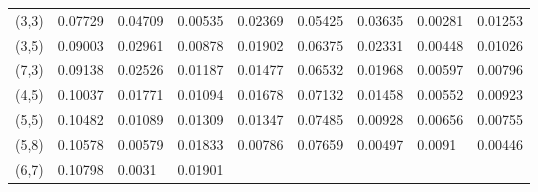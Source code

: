 \documentclass[10pt,twosided]{article}
\numberwithin{equation}{section}
\numberwithin{equation}{section}
\begin{document}
\begin{table}
\begin{tabular}{|p{41pt}|p{32pt}|p{38pt}|p{32pt}|p{38pt}|p{32pt}|p{38pt}|p{32pt}|p{38pt}|}
{} \\
\hline
\parbox{41pt}{\raggedright
(3,3)
} & \parbox{32pt}{\raggedright
0.07729
} & \parbox{38pt}{\raggedright
0.04709
} & \parbox{32pt}{\raggedright
0.00535
} & \parbox{38pt}{\raggedright
0.02369
} & \parbox{32pt}{\raggedright
0.05425
} & \parbox{38pt}{\raggedright
0.03635
} & \parbox{32pt}{\raggedright
0.00281
} & \parbox{38pt}{\raggedright
0.01253
} \\
\hline
\parbox{41pt}{\raggedright
(3,5)
} & \parbox{32pt}{\raggedright
0.09003
} & \parbox{38pt}{\raggedright
0.02961
} & \parbox{32pt}{\raggedright
0.00878
} & \parbox{38pt}{\raggedright
0.01902
} & \parbox{32pt}{\raggedright
0.06375
} & \parbox{38pt}{\raggedright
0.02331
} & \parbox{32pt}{\raggedright
0.00448
} & \parbox{38pt}{\raggedright
0.01026
} \\
\hline
\parbox{41pt}{\raggedright
(7,3)
} & \parbox{32pt}{\raggedright
0.09138
} & \parbox{38pt}{\raggedright
0.02526
} & \parbox{32pt}{\raggedright
0.01187
} & \parbox{38pt}{\raggedright
0.01477
} & \parbox{32pt}{\raggedright
0.06532
} & \parbox{38pt}{\raggedright
0.01968
} & \parbox{32pt}{\raggedright
0.00597
} & \parbox{38pt}{\raggedright
0.00796
} \\
\hline
\parbox{41pt}{\raggedright
(4,5)
} & \parbox{32pt}{\raggedright
0.10037
} & \parbox{38pt}{\raggedright
0.01771
} & \parbox{32pt}{\raggedright
0.01094
} & \parbox{38pt}{\raggedright
0.01678
} & \parbox{32pt}{\raggedright
0.07132
} & \parbox{38pt}{\raggedright
0.01458
} & \parbox{32pt}{\raggedright
0.00552
} & \parbox{38pt}{\raggedright
0.00923
} \\
\hline
\parbox{41pt}{\raggedright
(5,5)
} & \parbox{32pt}{\raggedright
0.10482
} & \parbox{38pt}{\raggedright
0.01089
} & \parbox{32pt}{\raggedright
0.01309
} & \parbox{38pt}{\raggedright
0.01347
} & \parbox{32pt}{\raggedright
0.07485
} & \parbox{38pt}{\raggedright
0.00928
} & \parbox{32pt}{\raggedright
0.00656
} & \parbox{38pt}{\raggedright
0.00755
} \\
\hline
\parbox{41pt}{\raggedright
(5,8)
} & \parbox{32pt}{\raggedright
0.10578
} & \parbox{38pt}{\raggedright
0.00579
} & \parbox{32pt}{\raggedright
0.01833
} & \parbox{38pt}{\raggedright
0.00786
} & \parbox{32pt}{\raggedright
0.07659
} & \parbox{38pt}{\raggedright
0.00497
} & \parbox{32pt}{\raggedright
0.0091
} & \parbox{38pt}{\raggedright
0.00446
} \\
\hline
\parbox{41pt}{\raggedright
(6,7)
} & \parbox{32pt}{\raggedright
0.10798
} & \parbox{38pt}{\raggedright
0.0031
} & \parbox{32pt}{\raggedright
0.01901
} & \parbox{38pt}{\raggedright
}
\end{tabular}
\end{table}
\end{document}
